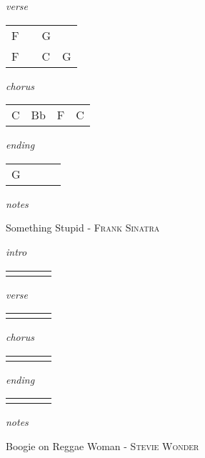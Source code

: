 \documentclass[12pt]{article}
\begin{document}
\textit{verse}

\begin{tabular}{|P{1.25in}|P{1.25in}|P{1.25in}|P{1.25in}|}
  F &   & G  &   \\
  F &   & C  & G
\end{tabular}

\textit{chorus}

\begin{tabular}{|P{1.25in}|P{1.25in}|P{1.25in}|P{1.25in}|}
  C & Bb  & F  &  C  \\
\end{tabular}

\textit{ending}

\begin{tabular}{|P{1.25in}|P{1.25in}|P{1.25in}|P{1.25in}|}
  G &   &   &   \\
\end{tabular}

\textit{notes}

\newpage

{\Huge Something Stupid} {\huge - \textsc{Frank Sinatra}}

\huge
\textit{intro}

\begin{tabular}{|P{1.25in}|P{1.25in}|P{1.25in}|P{1.25in}|}
    &   &   &   \\
\end{tabular}

\textit{verse}

\begin{tabular}{|P{1.25in}|P{1.25in}|P{1.25in}|P{1.25in}|}
    &   &   &   \\
\end{tabular}

\textit{chorus}

\begin{tabular}{|P{1.25in}|P{1.25in}|P{1.25in}|P{1.25in}|}
    &   &   &   \\
\end{tabular}

\textit{ending}

\begin{tabular}{|P{1.25in}|P{1.25in}|P{1.25in}|P{1.25in}|}
    &   &   &   \\
\end{tabular}

\textit{notes}

\newpage

{\Huge Boogie on Reggae Woman} {\huge - \textsc{Stevie Wonder}}
\end{document}
